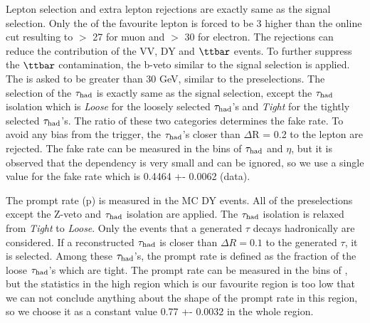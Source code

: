 Lepton selection and extra lepton rejections are exactly same as the signal selection. Only the \pt of the favourite lepton is forced to 
be 3 \GeV higher than the online cut resulting to \pt $>$ 27 \GeV for muon and \pt $>$ 30 \GeV for electron.
The rejections can reduce the contribution of the VV, DY and $\ttbar$ events. To further suppress the $\ttbar$ contamination, the b-veto 
similar to the signal selection is applied. The \MET is asked to be greater than 30 GeV, similar to the preselections. The selection of the $\tau_{\rm had}$ is 
exactly same as the signal selection, except the $\tau_{\rm had}$ isolation which is {\it Loose} for the loosely selected $\tau_{\rm had}$'s and {\it Tight} for the 
tightly selected $\tau_{\rm had}$'s.
The ratio of these two categories determines the fake rate. To avoid any bias from the trigger, the $\tau_{\rm had}$'s closer than $\Delta$R = 0.2 to the 
lepton are rejected. 
The fake rate can be measured in the bins of $\tau_{\rm had}$ \pt and $\eta$, but it is observed that the dependency is very small and can be ignored, 
so we use a single value for the fake rate which is    0.4464 +- 0.0062 (data).

The prompt rate (p) is measured in the MC DY events. All of the preselections except the Z-veto and $\tau_{\rm had}$ isolation are applied. The $\tau_{\rm had}$ isolation 
is relaxed from {\it Tight} to {\it Loose}. Only the events that a generated $\tau$ decays hadronically are considered. If a reconstructed $\tau_{\rm had}$ is 
closer than $\Delta R = 0.1$ to the generated $\tau$, it is selected. Among these $\tau_{\rm had}$'s, the prompt rate is defined as the fraction of the loose $\tau_{\rm had}$'s 
which are tight. The prompt rate can be measured in the bins of \mttwo, but the statistics in the high \mttwo region which is our favourite 
region is too low that we can not conclude anything about the shape of the prompt rate in this region, so we choose it as a constant value
0.77 +- 0.0032 in the whole \mttwo region.

